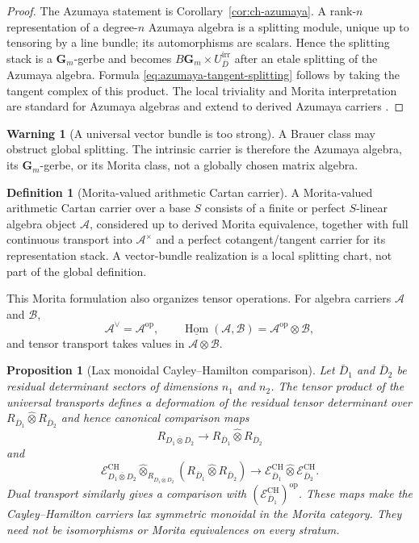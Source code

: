 \documentclass[11pt]{article}
\newtheorem{proposition}[theorem]{Proposition}
\theoremstyle{definition}
\newtheorem{definition}[theorem]{Definition}
\newtheorem{warning}[theorem]{Warning}
\newcommand{\Gm}{\mathbf G_m}
\begin{document}
\begin{proof}
The Azumaya statement is Corollary~\ref{cor:ch-azumaya}.  A rank-$n$ representation of a degree-$n$ Azumaya algebra is a splitting module, unique up to tensoring by a line bundle; its automorphisms are scalars.  Hence the splitting stack is a $\Gm$-gerbe and becomes $B\Gm\times U_{\bar D}^{\mathrm{irr}}$ after an etale splitting of the Azumaya algebra.  Formula \eqref{eq:azumaya-tangent-splitting} follows by taking the tangent complex of this product.  The local triviality and Morita interpretation are standard for Azumaya algebras and extend to derived Azumaya carriers \cite{ToenAzumaya}.
\end{proof}

\begin{warning}[A universal vector bundle is too strong]\label{warn:brauer-splitting}
A Brauer class may obstruct global splitting.  The intrinsic carrier is therefore the Azumaya algebra, its $\Gm$-gerbe, or its Morita class, not a globally chosen matrix algebra.
\end{warning}

\begin{definition}[Morita-valued arithmetic Cartan carrier]\label{def:morita-carrier}
A Morita-valued arithmetic Cartan carrier over a base $S$ consists of a finite or perfect $S$-linear algebra object $\mathcal A$, considered up to derived Morita equivalence, together with full continuous transport into $\mathcal A^{\times}$ and a perfect cotangent/tangent carrier for its representation stack.  A vector-bundle realization is a local splitting chart, not part of the global definition.
\end{definition}

This Morita formulation also organizes tensor operations.  For algebra carriers $\mathcal A$ and $\mathcal B$,
\[
\mathcal A^{\vee}=\mathcal A^{\mathrm{op}},
\qquad
\underline{\operatorname{Hom}}(\mathcal A,\mathcal B)
=\mathcal A^{\mathrm{op}}\otimes\mathcal B,
\]
and tensor transport takes values in $\mathcal A\otimes\mathcal B$.

\begin{proposition}[Lax monoidal Cayley--Hamilton comparison]\label{prop:ch-lax-monoidal}
Let $\bar D_1$ and $\bar D_2$ be residual determinant sectors of dimensions $n_1$ and $n_2$.  The tensor product of the universal transports defines a deformation of the residual tensor determinant over
$R_{\bar D_1}\widehat\otimes R_{\bar D_2}$ and hence canonical comparison maps
\[
R_{\overline{D_1\otimes D_2}}
\longrightarrow
R_{\bar D_1}\widehat\otimes R_{\bar D_2}
\]
and
\[
\mathcal E^{\mathrm{CH}}_{\overline{D_1\otimes D_2}}
\widehat\otimes_{R_{\overline{D_1\otimes D_2}}}
(R_{\bar D_1}\widehat\otimes R_{\bar D_2})
\longrightarrow
\mathcal E^{\mathrm{CH}}_{\bar D_1}
\widehat\otimes
\mathcal E^{\mathrm{CH}}_{\bar D_2}.
\]
Dual transport similarly gives a comparison with
$(\mathcal E^{\mathrm{CH}}_{\bar D_1})^{\mathrm{op}}$.  These maps make the Cayley--Hamilton carriers lax symmetric monoidal in the Morita category.  They need not be isomorphisms or Morita equivalences on every stratum.
\end{proposition}
\end{document}
